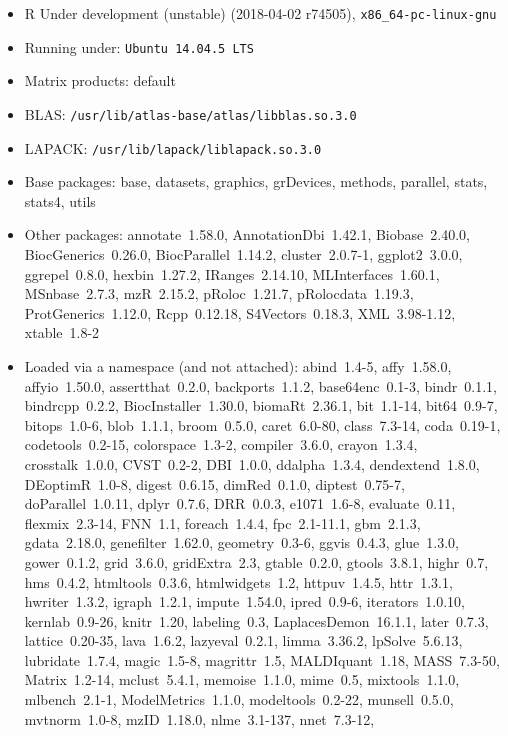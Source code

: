 \documentclass[12pt]{article}\usepackage[]{graphicx}\usepackage[]{color}
\begin{document}
\begin{appendices}
\begin{itemize}\raggedright
  \item R Under development (unstable) (2018-04-02 r74505), \verb|x86_64-pc-linux-gnu|
  \item Running under: \verb|Ubuntu 14.04.5 LTS|
  \item Matrix products: default
  \item BLAS: \verb|/usr/lib/atlas-base/atlas/libblas.so.3.0|
  \item LAPACK: \verb|/usr/lib/lapack/liblapack.so.3.0|
  \item Base packages: base, datasets, graphics, grDevices,
    methods, parallel, stats, stats4, utils
  \item Other packages: annotate~1.58.0, AnnotationDbi~1.42.1,
    Biobase~2.40.0, BiocGenerics~0.26.0, BiocParallel~1.14.2,
    cluster~2.0.7-1, ggplot2~3.0.0, ggrepel~0.8.0, hexbin~1.27.2,
    IRanges~2.14.10, MLInterfaces~1.60.1, MSnbase~2.7.3,
    mzR~2.15.2, pRoloc~1.21.7, pRolocdata~1.19.3,
    ProtGenerics~1.12.0, Rcpp~0.12.18, S4Vectors~0.18.3,
    XML~3.98-1.12, xtable~1.8-2
  \item Loaded via a namespace (and not attached): abind~1.4-5,
    affy~1.58.0, affyio~1.50.0, assertthat~0.2.0, backports~1.1.2,
    base64enc~0.1-3, bindr~0.1.1, bindrcpp~0.2.2,
    BiocInstaller~1.30.0, biomaRt~2.36.1, bit~1.1-14, bit64~0.9-7,
    bitops~1.0-6, blob~1.1.1, broom~0.5.0, caret~6.0-80,
    class~7.3-14, coda~0.19-1, codetools~0.2-15, colorspace~1.3-2,
    compiler~3.6.0, crayon~1.3.4, crosstalk~1.0.0, CVST~0.2-2,
    DBI~1.0.0, ddalpha~1.3.4, dendextend~1.8.0, DEoptimR~1.0-8,
    digest~0.6.15, dimRed~0.1.0, diptest~0.75-7,
    doParallel~1.0.11, dplyr~0.7.6, DRR~0.0.3, e1071~1.6-8,
    evaluate~0.11, flexmix~2.3-14, FNN~1.1, foreach~1.4.4,
    fpc~2.1-11.1, gbm~2.1.3, gdata~2.18.0, genefilter~1.62.0,
    geometry~0.3-6, ggvis~0.4.3, glue~1.3.0, gower~0.1.2,
    grid~3.6.0, gridExtra~2.3, gtable~0.2.0, gtools~3.8.1,
    highr~0.7, hms~0.4.2, htmltools~0.3.6, htmlwidgets~1.2,
    httpuv~1.4.5, httr~1.3.1, hwriter~1.3.2, igraph~1.2.1,
    impute~1.54.0, ipred~0.9-6, iterators~1.0.10, kernlab~0.9-26,
    knitr~1.20, labeling~0.3, LaplacesDemon~16.1.1, later~0.7.3,
    lattice~0.20-35, lava~1.6.2, lazyeval~0.2.1, limma~3.36.2,
    lpSolve~5.6.13, lubridate~1.7.4, magic~1.5-8, magrittr~1.5,
    MALDIquant~1.18, MASS~7.3-50, Matrix~1.2-14, mclust~5.4.1,
    memoise~1.1.0, mime~0.5, mixtools~1.1.0, mlbench~2.1-1,
    ModelMetrics~1.1.0, modeltools~0.2-22, munsell~0.5.0,
    mvtnorm~1.0-8, mzID~1.18.0, nlme~3.1-137, nnet~7.3-12,

\end{itemize}
\end{appendices}
\end{document}

